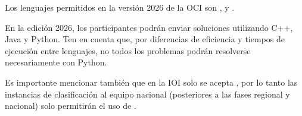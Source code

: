 {
    \new
Los lenguajes permitidos en la versión 2026 de la OCI son \cpp, \java y \python.

En la edición 2026, los participantes podrán enviar soluciones utilizando C++, Java y Python.
Ten en cuenta que, por diferencias de eficiencia y tiempos de ejecución entre lenguajes, no todos 
los problemas podrán resolverse necesariamente con Python.

Es importante mencionar también que en la IOI solo se acepta \cpp, por lo tanto las instancias 
de clasificación al equipo nacional (posteriores a las fases regional y nacional) solo permitirán 
el uso de \cpp.
}

